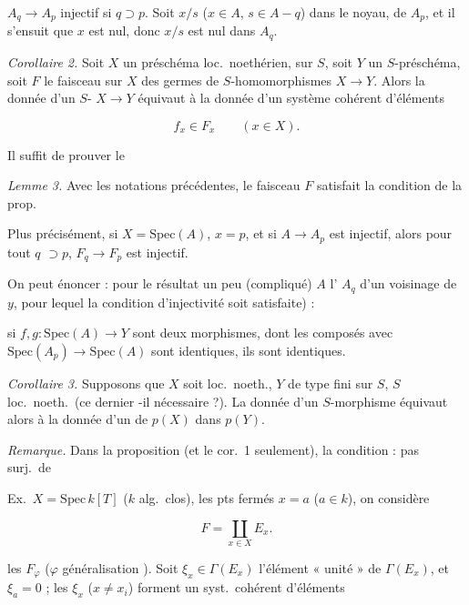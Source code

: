 \documentclass[11pt,a4paper]{article}
\begin{document}
 $A_q \to A_p$ injectif si $q \supset p$. Soit $x/s$
($x \in A$, $s \in A - q$) dans le noyau,  \ill{}
\struck{\ill{}} \ill{} de $A_p$, et 
 il s'ensuit que $x$ est nul, donc $x/s$ est nul dans
$A_q$.

\emph{Corollaire 2.} Soit $X$ un préschéma loc.\ noethérien,
 sur $S$, soit $Y$ un $S$-préschéma, soit $F$ le
\struck{\ill{}} faisceau sur $X$ des germes de $S$-homomorphismes $X \to Y$.
Alors la donnée d'un $S$- $X \to Y$ équivaut à la donnée
d'un système cohérent d'éléments

\[ f_x \in F_x \qquad (x \in X). \]

Il suffit de prouver le

\emph{Lemme 3.} Avec les notations précédentes, le faisceau $F$ satisfait la
condition de la prop.


 Plus précisément, si $X = \mathrm{Spec}(A)$, $x = p$, et si
$A \to A_p$ est injectif, alors pour tout $q$ 
$\supset p$, $F_q \to F_p$ est injectif.

\struck{\ill{}} On peut \struck{\ill{}} énoncer : pour \ill{} le résultat un
peu (compliqué) $A$ \ill{} l'\ill{} $A_q$ d'un voisinage de $y$, pour lequel
la condition d'injectivité \ill{} soit satisfaite) :

si $f, g : \mathrm{Spec}(A) \longrightarrow Y$ sont deux morphismes,
 dont les composés avec $\mathrm{Spec}(A_p) \to \mathrm{Spec}(A)$
sont identiques, ils sont identiques.

\emph{Corollaire 3.} Supposons que $X$ soit loc.\ noeth., $Y$
\struck{\ill{}} de type fini sur $S$, $S$ loc.\ noeth.\ (ce dernier
-il nécessaire ?). La donnée d'un $S$-morphisme
 équivaut alors à la donnée d'un \ill{} de $p(X)$ dans
$p(Y)$.

\emph{Remarque.} Dans la proposition (et le cor.\ 1 seulement), la
condition \ill{} :  \ill{} pas surj.\ de \ill{}

Ex.\ $X = \mathrm{Spec}\, k[T]$ ($k$ alg.\ clos),  \struck{\ill{}}
\ill{} les pts fermés $x = a$ ($a \in k$), \ill{} on considère
\struck{\ill{}}

\[ F = \coprod_{x \in X} E_x. \]

\ill{} les $F_\varphi$ \ill{} ($\varphi$ \ill{} généralisation \ill{}). Soit
$\xi_x \in \Gamma(E_x)$ l'élément « unité » de $\Gamma(E_x)$, et $\xi_a = 0$ ;
les $\xi_x$ ($x \neq x_i$) forment un syst.\ cohérent d'éléments \ill{}
\end{document}

